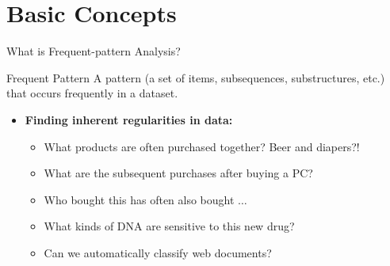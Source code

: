 \section{Basic Concepts}

\begin{frame}{What is Frequent-pattern Analysis?}

	\begin{block}{Frequent Pattern}
		A pattern (a set of items, subsequences, substructures, etc.) that occurs frequently in a dataset.
	\end{block}
	\begin{itemize}
		\item \textbf{Finding inherent regularities in data:}
		      \begin{itemize}
			      \item What products are often purchased together? Beer and diapers?!
			      \item What are the subsequent purchases after buying a PC?
			      \item Who bought this has often also bought $\ldots$
			      \item What kinds of DNA are sensitive to this new drug?
			      \item Can we automatically classify web documents?
		      \end{itemize}
	\end{itemize}

	\vspace{0.5cm}

\end{frame}

\newcommand{\smartphone}[2][]{

	\begin{tikzpicture}[#1]
		\draw[rounded corners=10pt, line width=1pt, fill=faugray!10]
		(0,0) rectangle (6,13.52);

		\draw[rounded corners=5pt, line width=0.5pt, fill=white]
		(0.3,0.8) rectangle (5.7,12.52);

		\begin{scope}
			\clip[rounded corners=5pt] (0.3,0.8) rectangle (5.7,12.52);
			\node[anchor=center, inner sep=0pt] at (3,6.66)
			{\texttt{[image: \#2]}};
		\end{scope}

		\draw[line width=0.5pt, fill=white] (3,0.4) circle (0.25);

		\draw[rounded corners=1pt, fill=faugraydark!50] (2.5,12.82) rectangle (3.5,13.02);

	\end{tikzpicture}
}

